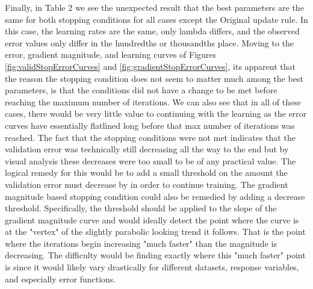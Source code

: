 \documentclass[runningheads]{llncs_2}
\begin{document}
Finally, in Table 2 we see the unexpected result that the best parameters are the same for both stopping conditions for all cases except the Original update rule. In this case, the learning rates are the same, only lambda differs, and the observed error values only differ in the hundredths or thousandths place. Moving to the error, gradient magnitude, and learning curves of Figures \ref{fig:validStopErrorCurves} and \ref{fig:gradientStopErrorCurves}, its apparent that the reason the stopping condition does not seem to matter much among the best parameters, is that the conditions did not have a change to be met before reaching the maximum number of iterations. We can also see that in all of these cases, there would be very little value to continuing with the learning as the error curves have essentially flatlined long before that max number of iterations was reached. The fact that the stopping conditions were not met indicates that the validation error was technically still decreasing all the way to the end but by visual analysis these decreases were too small to be of any practical value. The logical remedy for this would be to add a small threshold on the amount the validation error must decrease by in order to continue training. The gradient magnitude based stopping condition could also be remedied by adding a decrease threshold. Specifically, the threshold should be applied to the slope of the gradient magnitude curve and would ideally detect the point where the curve is at the "vertex" of the slightly parabolic looking trend it follows. That is the point where the iterations begin increasing "much faster" than the magnitude is decreasing. The difficulty would be finding exactly where this "much faster" point is since it would likely vary drastically for different datasets, response variables, and especially error functions.
\end{document}
